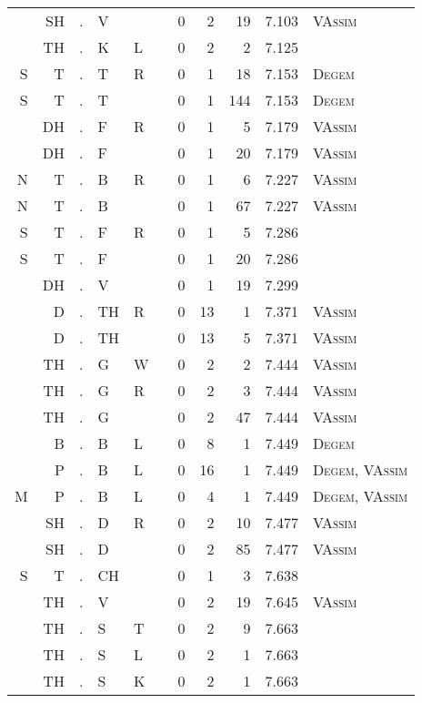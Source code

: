 \begin{longtable}{r@{ } r@{ } c@{ } l@{ } l@{ } l@{ } r r r r l }
  & SH & . & V &   &   & 0 & 2 & 19 & 7.103 & \textsc{VAssim} \\
  & TH & . & K & L &   & 0 & 2 & 2 & 7.125 &  \\
S & T & . & T & R &   & 0 & 1 & 18 & 7.153 & \textsc{Degem} \\
S & T & . & T &   &   & 0 & 1 & 144 & 7.153 & \textsc{Degem} \\
  & DH & . & F & R &   & 0 & 1 & 5 & 7.179 & \textsc{VAssim} \\
  & DH & . & F &   &   & 0 & 1 & 20 & 7.179 & \textsc{VAssim} \\
N & T & . & B & R &   & 0 & 1 & 6 & 7.227 & \textsc{VAssim} \\
N & T & . & B &   &   & 0 & 1 & 67 & 7.227 & \textsc{VAssim} \\
S & T & . & F & R &   & 0 & 1 & 5 & 7.286 &  \\
S & T & . & F &   &   & 0 & 1 & 20 & 7.286 &  \\
  & DH & . & V &   &   & 0 & 1 & 19 & 7.299 &  \\
  & D & . & TH & R &   & 0 & 13 & 1 & 7.371 & \textsc{VAssim} \\
  & D & . & TH &   &   & 0 & 13 & 5 & 7.371 & \textsc{VAssim} \\
  & TH & . & G & W &   & 0 & 2 & 2 & 7.444 & \textsc{VAssim} \\
  & TH & . & G & R &   & 0 & 2 & 3 & 7.444 & \textsc{VAssim} \\
  & TH & . & G &   &   & 0 & 2 & 47 & 7.444 & \textsc{VAssim} \\
  & B & . & B & L &   & 0 & 8 & 1 & 7.449 & \textsc{Degem} \\
  & P & . & B & L &   & 0 & 16 & 1 & 7.449 & \textsc{Degem}, \textsc{VAssim} \\
M & P & . & B & L &   & 0 & 4 & 1 & 7.449 & \textsc{Degem}, \textsc{VAssim} \\
  & SH & . & D & R &   & 0 & 2 & 10 & 7.477 & \textsc{VAssim} \\
  & SH & . & D &   &   & 0 & 2 & 85 & 7.477 & \textsc{VAssim} \\
S & T & . & CH &   &   & 0 & 1 & 3 & 7.638 &  \\
  & TH & . & V &   &   & 0 & 2 & 19 & 7.645 & \textsc{VAssim} \\
  & TH & . & S & T &   & 0 & 2 & 9 & 7.663 &  \\
  & TH & . & S & L &   & 0 & 2 & 1 & 7.663 &  \\
  & TH & . & S & K &   & 0 & 2 & 1 & 7.663 &  \\

\end{longtable}
